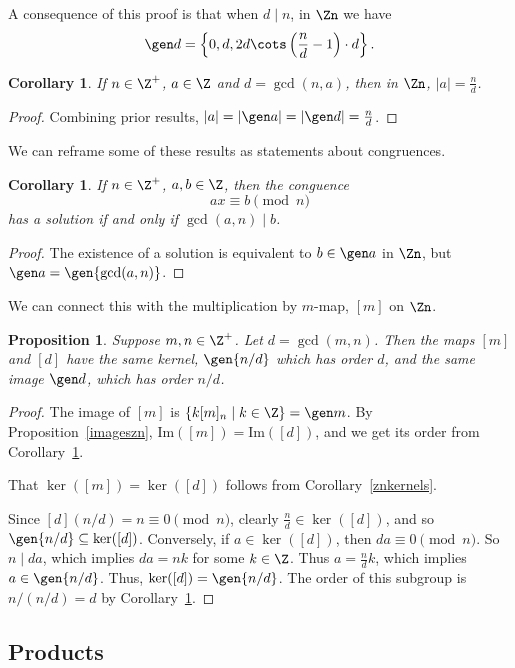 \documentclass[12pt]{amsart}
\renewcommand{\Im}{\mathrm{Im}} %
\theoremstyle{plain}
\newtheorem{prop}[thm]{Proposition}
\newtheorem{cor}[thm]{Corollary}
\theoremstyle{definition}
\theoremstyle{remark}
\begin{document}
  A consequence of this proof is that when $d\mid n$, in $\Zn$ we have
  \[ \gen d = \left\{0, d, 2d\cots \left(\frac n d-1\right) \cdot d\right\}.\]

\begin{cor}\label{ordercor}
  If $n\in\Z^+$, $a\in \Z$ and $d=\gcd(n,a)$, then in $\Zn$,
  $|a|=\frac nd$.
\end{cor}
\begin{proof}
  Combining prior results, $|a|=|\gen a| = |\gen d| = \frac nd$.
\end{proof}

We can reframe some of these results as statements about congruences.
\begin{cor}
  If $n\in\Z^+$, $a,b\in\Z$, then the conguence
  \[  ax\equiv b\pmod n\]
  has a solution if and only if $\gcd(a,n)\mid b$.
\end{cor}
\begin{proof}
  The existence of a solution is equivalent to $b\in\gen a$ in $\Zn$,
  but $\gen a = \gen{\gcd(a,n)}$.
\end{proof}

We can connect this with the multiplication by $m$-map, $[m]$ on
$\Zn$.
\begin{prop}
  Suppose $m,n\in\Z^+$.  Let $d=\gcd(m,n)$.  Then the maps $[m]$ and
  $[d]$ have the same kernel, $\gen{n/d}$ which has order $d$, and the
  same image $\gen d$, which has order $n/d$.
\end{prop}
\begin{proof}
  The image of $[m]$ is $\{k[m]_n\mid k\in\Z\}=\gen m$.  By
  Proposition~\ref{imageszn}, $\Im([m])=\Im([d])$, and we get its
  order from Corollary~\ref{ordercor}.

  That $\ker([m])=\ker([d])$ follows from Corollary~\ref{znkernels}.
  
  Since $[d](n/d)=n\equiv 0\pmod n$, clearly $\frac n d \in
  \ker([d])$, and so $\gen{n/d}\subseteq \ker([d])$.  Conversely, if
  $a\in\ker([d])$, then $da\equiv 0\pmod n$.  So $n\mid da$, which
  implies $da=nk$ for some $k\in\Z$.  Thus $a=\frac n d k$, which
  implies $a\in\gen{n/d}$.  Thus, $\ker([d])=\gen{n/d}$.  The order of
  this subgroup is $n/(n/d)=d$ by Corollary~\ref{ordercor}.
\end{proof}

\subsection{Products}
\end{document}

